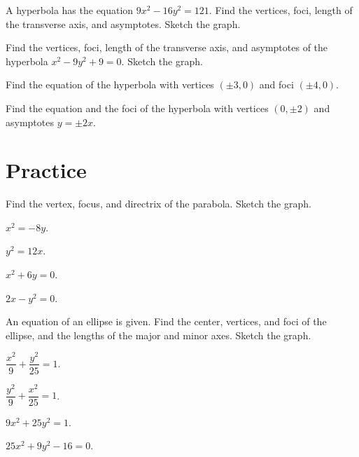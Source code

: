 \begin{example}
    A hyperbola has the equation $9x^2-16y^2=121$.
Find the vertices, foci, length of the transverse axis, and asymptotes. Sketch the graph.
\end{example}
\vspace*{8\baselineskip}

\begin{example}
    Find the vertices, foci, length of the transverse axis, and asymptotes of the hyperbola $x^2-9y^2+9=0$. Sketch the graph.
\end{example}
\vspace*{8\baselineskip}

\begin{example}
    Find the equation of the hyperbola with vertices $(\pm 3, 0)$ and foci $(\pm 4, 0)$.
\end{example}
\vspace*{8\baselineskip}

\begin{example}
Find the equation and the foci of the hyperbola with vertices $(0,\pm 2)$ and asymptotes $y=\pm2x$.
\end{example}
\vspace*{8\baselineskip}

\section*{Practice}

\begin{exercise}
    Find the vertex, focus, and directrix of the parabola. Sketch the graph.\\
    \begin{enumerate*}
        \item $x^2=-8y$.
        \item $y^2=12x$.
        \item $x^2+6y=0$.
        \item $2x-y^2=0$.
    \end{enumerate*}
\end{exercise}
\vspace*{10\baselineskip}

\begin{exercise}
    An equation of an ellipse is given. Find the center, vertices, and foci of the ellipse, and the lengths of the major and minor axes. Sketch the graph.\\
    \begin{enumerate*}
        \item $\dfrac{x^2}{9}+\dfrac{y^2}{25}=1$.
        \item $\dfrac{y^2}{9}+\dfrac{x^2}{25}=1$.
        \item $9x^2+25y^2=1$.
        \item $25x^2+9y^2-16=0$.
    \end{enumerate*}
\end{exercise}
\vspace*{10\baselineskip}

